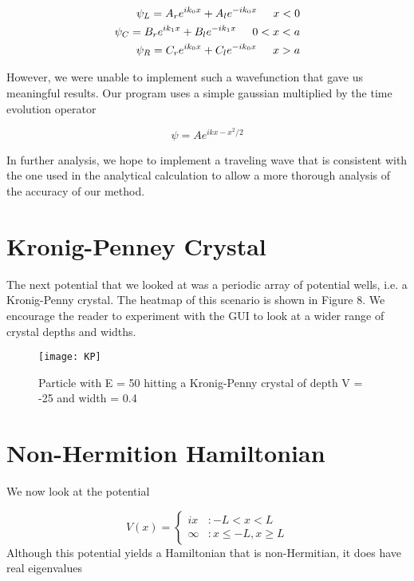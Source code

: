 \documentclass{article}
\begin{document}
\begin{align*}
\psi_L = A_r e^{ik_0x} + A_l e^{-ik_0x} \hspace{0.2in} x < 0 \\
\psi_C = B_r e^{ik_1x} + B_l e^{-ik_1x} \hspace{0.2in} 0 < x < a \\
\psi_R = C_r e^{ik_0x} + C_l e^{-ik_0x} \hspace{0.2in} x > a
\end{align*}

However, we were unable to implement such a wavefunction that gave us meaningful results. Our program uses a simple gaussian multiplied by the time evolution operator

\begin{equation}
\psi = A e^{ikx - x^2/2}
\end{equation}

In further analysis, we hope to implement a traveling wave that is consistent with the one used in the analytical calculation to allow a more thorough analysis of the accuracy of our method.

\section{Kronig-Penney Crystal}

The next potential that we looked at was a periodic array of potential wells, i.e. a Kronig-Penny crystal. The heatmap of this scenario is shown in Figure 8. We encourage the reader to experiment with the GUI to look at a wider range of crystal depths and widths. 


\begin{figure}
\centering
\texttt{[image: KP]}
\caption{ Particle with E = 50 hitting a Kronig-Penny crystal of depth V = -25 and width = 0.4 }
\end{figure}


\section{Non-Hermition Hamiltonian}

We now look at the potential 

\[V(x) = \left\{
  \begin{array}{lr}
    ix &  : -L < x  < L \\
    \infty & : x \leq -L , x \geq L 
  \end{array}
\right.
\]
%
Although this potential yields a Hamiltonian that is non-Hermitian, it does have real eigenvalues 
\end{document}
